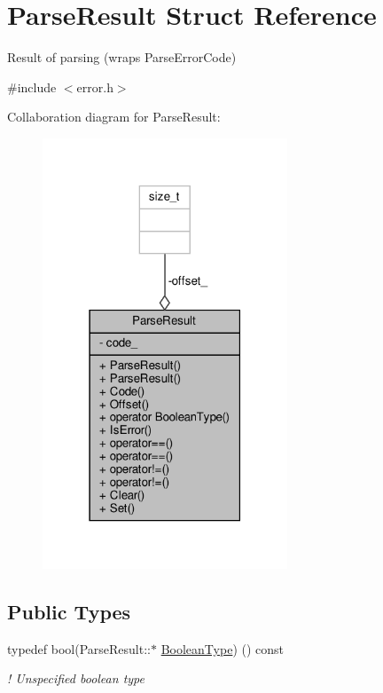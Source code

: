 \hypertarget{structParseResult}{}\section{Parse\+Result Struct Reference}
\label{structParseResult}


Result of parsing (wraps Parse\+Error\+Code)  




{\ttfamily \#include $<$error.\+h$>$}



Collaboration diagram for Parse\+Result\+:
\nopagebreak
\begin{figure}[H]
\begin{center}
\leavevmode
\includegraphics[width=207pt]{structParseResult__coll__graph}
\end{center}
\end{figure}
\subsection*{Public Types}
\begin{DoxyCompactItemize}
\item 
typedef bool(Parse\+Result\+::$\ast$ \hyperlink{structParseResult_a991cd2759ba802bdb5e960d40890e874}{Boolean\+Type}) () const
\begin{DoxyCompactList}\small\item\em ! Unspecified boolean type \end{DoxyCompactList}\end{DoxyCompactItemize}
